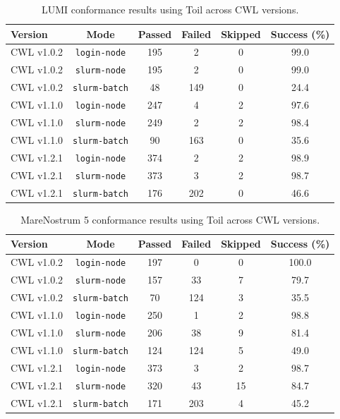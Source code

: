\documentclass{article}
\begin{document}
\begin{table}[ht!]
\centering
\renewcommand{\arraystretch}{1.2}
\setlength{\tabcolsep}{6pt}
\begin{tabular}{|l|c|c|c|c|c|}
\hline
\rowcolor{lightgray!50}
\textbf{Version} & \textbf{Mode} & \textbf{Passed} & \textbf{Failed} & \textbf{Skipped} & \textbf{Success (\%)} \\
\hline
CWL v1.0.2 & \texttt{login-node} & 195 & 2 & 0 & 99.0 \\ \hline
CWL v1.0.2 & \texttt{slurm-node} & 195 & 2 & 0 & 99.0 \\ \hline
CWL v1.0.2 & \texttt{slurm-batch} & 48 & 149 & 0 & 24.4 \\ \hline
\hline
CWL v1.1.0 & \texttt{login-node} & 247 & 4 & 2 & 97.6 \\ \hline
CWL v1.1.0 & \texttt{slurm-node} & 249 & 2 & 2 & 98.4 \\ \hline
CWL v1.1.0 & \texttt{slurm-batch} & 90 & 163 & 0 & 35.6 \\ \hline
\hline
CWL v1.2.1 & \texttt{login-node} & 374 & 2 & 2 & 98.9 \\ \hline
CWL v1.2.1 & \texttt{slurm-node} & 373 & 3 & 2 & 98.7 \\ \hline
CWL v1.2.1 & \texttt{slurm-batch} & 176 & 202 & 0 & 46.6 \\ \hline
\hline
\end{tabular}
\caption{LUMI conformance results using Toil across CWL versions.}
\end{table}

\begin{table}[ht!]
\centering
\renewcommand{\arraystretch}{1.2}
\setlength{\tabcolsep}{6pt}
\begin{tabular}{|l|c|c|c|c|c|}
\hline
\rowcolor{lightgray!50}
\textbf{Version} & \textbf{Mode} & \textbf{Passed} & \textbf{Failed} & \textbf{Skipped} & \textbf{Success (\%)} \\
\hline
CWL v1.0.2 & \texttt{login-node} & 197 & 0 & 0 & 100.0 \\ \hline
CWL v1.0.2 & \texttt{slurm-node} & 157 & 33 & 7 & 79.7 \\ \hline
CWL v1.0.2 & \texttt{slurm-batch} & 70 & 124 & 3 & 35.5 \\ \hline
\hline
CWL v1.1.0 & \texttt{login-node} & 250 & 1 & 2 & 98.8 \\ \hline
CWL v1.1.0 & \texttt{slurm-node} & 206 & 38 & 9 & 81.4 \\ \hline
CWL v1.1.0 & \texttt{slurm-batch} & 124 & 124 & 5 & 49.0 \\ \hline
\hline
CWL v1.2.1 & \texttt{login-node} & 373 & 3 & 2 & 98.7 \\ \hline
CWL v1.2.1 & \texttt{slurm-node} & 320 & 43 & 15 & 84.7 \\ \hline
CWL v1.2.1 & \texttt{slurm-batch} & 171 & 203 & 4 & 45.2 \\ \hline
\hline
\end{tabular}
\caption{MareNostrum 5 conformance results using Toil across CWL versions.}
\end{table}
\end{document}
